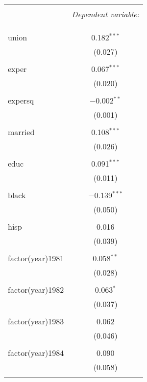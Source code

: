 
\begin{table}[!htbp] \centering 
  \caption{} 
  \label{} 
\begin{tabular}{@{\extracolsep{5pt}}lc} 
\\[-1.8ex]\hline 
\hline \\[-1.8ex] 
 & \multicolumn{1}{c}{\textit{Dependent variable:}} \\ 
\cline{2-2} 
\\[-1.8ex] &   \\ 
\hline \\[-1.8ex] 
 union & 0.182$^{***}$ \\ 
  & (0.027) \\ 
  & \\ 
 exper & 0.067$^{***}$ \\ 
  & (0.020) \\ 
  & \\ 
 expersq & $-$0.002$^{**}$ \\ 
  & (0.001) \\ 
  & \\ 
 married & 0.108$^{***}$ \\ 
  & (0.026) \\ 
  & \\ 
 educ & 0.091$^{***}$ \\ 
  & (0.011) \\ 
  & \\ 
 black & $-$0.139$^{***}$ \\ 
  & (0.050) \\ 
  & \\ 
 hisp & 0.016 \\ 
  & (0.039) \\ 
  & \\ 
 factor(year)1981 & 0.058$^{**}$ \\ 
  & (0.028) \\ 
  & \\ 
 factor(year)1982 & 0.063$^{*}$ \\ 
  & (0.037) \\ 
  & \\ 
 factor(year)1983 & 0.062 \\ 
  & (0.046) \\ 
  & \\ 
 factor(year)1984 & 0.090 \\ 
  & (0.058) \\ 
  & \\ 

\end{tabular}
\end{table}
